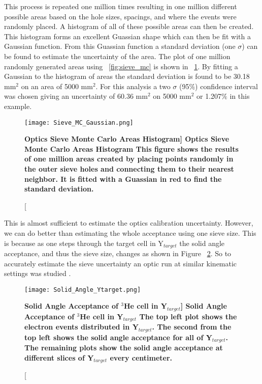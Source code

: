 This process is repeated one million times resulting in one million different possible areas based on the hole sizes, spacings, and where the events were randomly placed. A histogram of all of these possible areas can then be created. This histogram forms an excellent Guassian shape which can then be fit with a Gaussian function. From this Guassian function a standard deviation (one $\sigma$) can be found to estimate the uncertainty of the area. The plot of one million randomly generated areas using ~\ref{fig:sieve_mc} is shown in ~\ref{fig:sieve_mc_gaussian}. By fitting a Gaussian to the histogram of areas the standard deviation is found to be 30.18 mm$^2$ on an area of 5000 mm$^2$. For this analysis a two $\sigma$ (95$\%$) confidence interval was chosen giving an uncertainty of 60.36 mm$^2$ on 5000 mm$^2$ or 1.207$\%$ in this example. 

\begin{figure}[!ht]
\begin{center}
\texttt{[image: Sieve\_MC\_Gaussian.png]}
\end{center}
\caption[\bf{Optics Sieve Monte Carlo Areas Histogram}]{
{\bf{Optics Sieve Monte Carlo Areas Histogram}} This figure shows the results of one million areas created by placing points randomly in the outer sieve holes and connecting them to their nearest neighbor. It is fitted with a Guassian in red to find the standard deviation.}
\label{fig:sieve_mc_gaussian}
\end{figure}

This is almost sufficient to estimate the optics calibration uncertainty. However, we can do better than estimating the whole acceptance using one sieve size. This is because as one steps through the target cell in Y$_{target}$ the solid angle acceptance, and thus the sieve size, changes as shown in Figure ~\ref{fig:solid_angle_ytarget}. So to accurately estimate the sieve uncertainty an optic run at similar kinematic settings was studied \cite{shujie_optics}. 

\begin{figure}[!ht]
\begin{center}
\texttt{[image: Solid\_Angle\_Ytarget.png]}
\end{center}
\caption[\bf{Solid Angle Acceptance of $^3$He cell in Y$_{target}$}]{
{\bf{Solid Angle Acceptance of $^3$He cell in Y$_{target}$}} The top left plot shows the electron events distributed in Y$_{target}$. The second from the top left shows the solid angle acceptance for all of Y$_{target}$. The remaining plots show the solid angle acceptance at different slices of Y$_{target}$ every centimeter.}
\label{fig:solid_angle_ytarget}
\end{figure}

